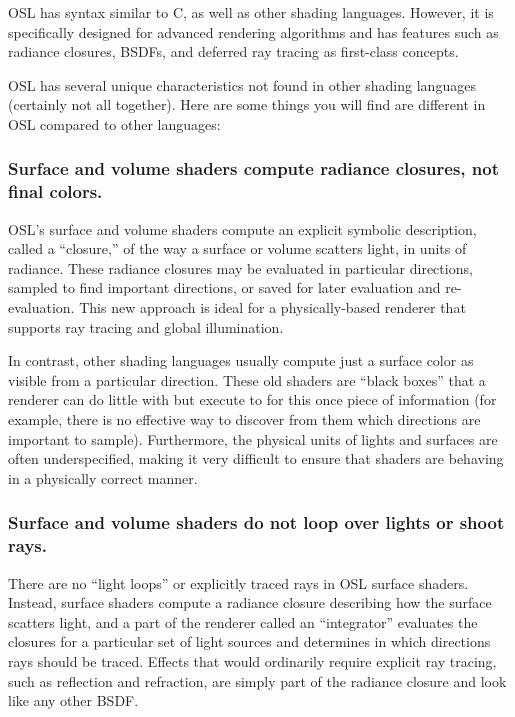 \documentclass[11pt,letterpaper]{book}
\begin{document}
OSL has syntax similar to C, as well as other shading languages.
However, it is specifically designed for advanced rendering algorithms
and has features such as radiance closures, BSDFs, and deferred ray
tracing as first-class concepts.

OSL has several unique characteristics not found in other shading
languages (certainly not all together).  Here are some things you will
find are different in OSL compared to other languages:

\subsubsection*{Surface and volume shaders compute radiance closures, not final colors.}

  OSL's surface and volume shaders compute an explicit symbolic
  description, called a ``closure,'' of the way a surface or volume
  scatters light, in units of radiance.  These radiance closures may be
  evaluated in particular directions, sampled to find important
  directions, or saved for later evaluation and re-evaluation.
  This new approach is ideal for a physically-based renderer that
  supports ray tracing and global illumination.

  In contrast, other shading languages usually compute just a surface
  color as visible from a particular direction.  These old shaders are
  ``black boxes'' that a renderer can do little with but execute to for
  this once piece of information (for example, there is no effective way
  to discover from them which directions are important to sample).
  Furthermore, the physical units of lights and surfaces are often
  underspecified, making it very difficult to ensure that shaders are
  behaving in a physically correct manner.

\subsubsection*{Surface and volume shaders do not loop over lights or shoot rays.}

  There are no ``light loops'' or explicitly traced rays in OSL surface
  shaders.  Instead, surface shaders compute a radiance closure
  describing how the surface scatters light, and a part of the renderer
  called an ``integrator'' evaluates the closures for a particular set of
  light sources and determines in which directions rays should be
  traced.  Effects that would ordinarily require explicit ray tracing,
  such as reflection and refraction, are simply part of the radiance
  closure and look like any other BSDF.
\end{document}
